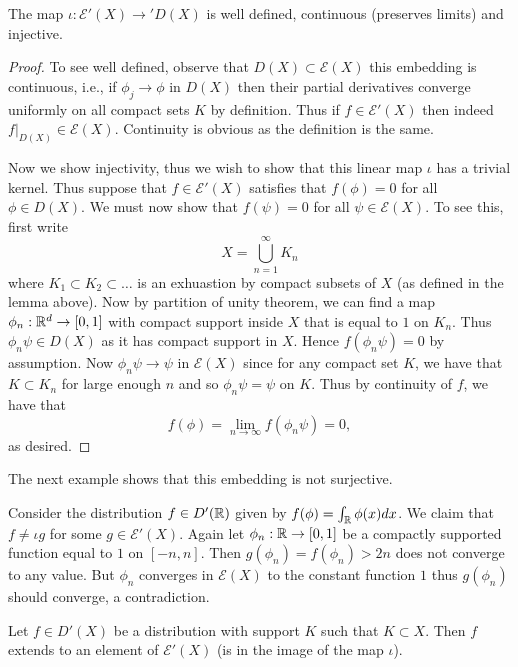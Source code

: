 \documentclass[twoside, a4paper, 10pt]{amsart}
\begin{document}
\begin{lemma}\label{lemma: E' embeds in D'} The map $\iota:\mathcal{E}'(X) \to 'D(X)$ is well defined, continuous (preserves limits) and injective.

\end{lemma}

\begin{proof} To see well defined, observe that $D(X) \subset \mathcal{E}(X)$ this embedding is continuous, i.e., if $\phi_j \to \phi$ in $D(X)$ then their partial derivatives converge uniformly on all compact sets $K$ by definition. Thus if $f \in \mathcal{E}'(X)$ then indeed $f|_{D(X)} \in \mathcal{E}(X)$. Continuity is obvious as the definition is the same. 

Now we show injectivity, thus we wish to show that this linear map $\iota$ has a trivial kernel. Thus suppose that $f \in \mathcal{E}'(X)$ satisfies that $f(\phi) = 0$ for all $\phi \in D(X)$. We must now show that $f(\psi) = 0$ for all $\psi \in \mathcal{E}(X)$. To see this, first write $$X = \bigcup_{n=1}^{\infty} K_n$$ where $K_1 \subset K_2 \subset \ldots$ is an exhuastion by compact subsets of $X$ (as defined in the lemma above). Now by partition of unity theorem, we can find a map $\phi_n:\mathbb{R}^d \to [0,1]$ with compact support inside $X$ that is equal to $1$ on $K_n$.  Thus $\phi_n \psi \in D(X)$ as it has compact support in $X$. Hence $f(\phi_n \psi) = 0$ by assumption. Now $\phi_n\psi \to \psi$ in $\mathcal{E}(X)$ since for any compact set $K$, we have that $K \subset K_n$ for large enough $n$ and so $\phi_n\psi = \psi$ on $K$. Thus by continuity of $f$, we have that $$f(\phi) = \lim_{n \to \infty} f(\phi_n \psi) = 0,$$ as desired. \end{proof}

The next example shows that this embedding is not surjective.

\begin{eg} Consider the distribution $f \in D'(\mathbb{R})$ given by $f(\phi) = \int_{\mathbb{R}} \phi(x) dx $. We claim that $f \neq \iota g$ for some $g \in \mathcal{E}'(X)$. Again let $\phi_n:\mathbb{R} \to [0,1]$ be a compactly supported function equal to $1$ on $[-n,n]$. Then $g(\phi_n) = f(\phi_n) > 2n$ does not converge to any value. But $\phi_n$ converges in $\mathcal{E}(X)$ to the constant function $1$ thus $g(\phi_n)$ should converge, a contradiction. 

\end{eg}

\begin{lemma} Let $f \in D'(X)$ be a distribution with support $K$ such that $K \subset X$. Then $f$ extends to an element of $\mathcal{E}'(X)$ (is in the image of the map $\iota$).

\end{lemma}
\end{document}
